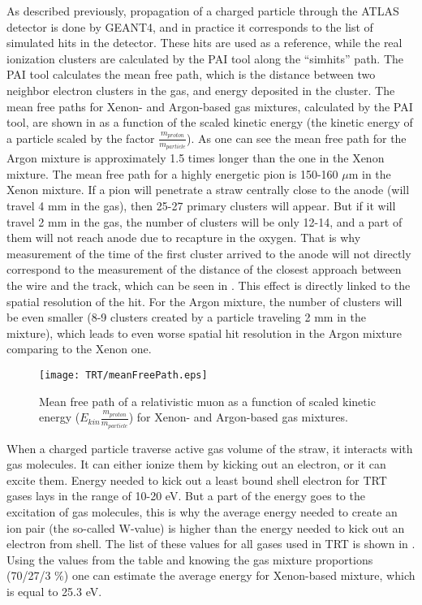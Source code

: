 As described previously, propagation of a charged particle through the ATLAS detector is done by GEANT4, and in practice it corresponds to the list of simulated hits in the detector.
These hits are used as a reference, while the real ionization clusters are calculated by the PAI tool along the ``simhits'' path.
The PAI tool calculates the mean free path, which is the distance between two neighbor electron clusters in the gas, and energy deposited in the cluster. 
The mean free paths for Xenon- and Argon-based gas mixtures, calculated by the PAI tool, are shown in  as a function of the scaled kinetic energy 
(the kinetic energy of a particle scaled by the factor $\frac{m_{proton}}{m_{particle}}$). As one can see the mean free path for the Argon mixture is approximately 1.5 times longer than the one in the Xenon mixture.
The mean free path for a highly energetic pion is 150-160 $\mu$m in the Xenon mixture. If a pion will penetrate a straw centrally close to the anode (will travel 4 mm in the gas), then 25-27 primary clusters will appear.
But if it will travel 2 mm in the gas, the number of clusters will be only 12-14, and a part of them will not reach anode due to recapture in the oxygen. 
That is why measurement of the time of the first cluster arrived to the anode will not directly correspond to the measurement of the distance of the closest approach between the wire and the track, 
which can be seen in . This effect is directly linked to the spatial resolution of the hit.
For the Argon mixture, the number of clusters will be even smaller (8-9 clusters created by a particle traveling 2 mm in the mixture), which leads to even worse spatial hit resolution in the Argon mixture comparing 
to the Xenon one.

\begin{figure}
\centering
 \texttt{[image: TRT/meanFreePath.eps]}
\caption{Mean free path of a relativistic muon as a function of scaled kinetic energy ($E_{kin}\frac{m_{proton}}{m_{particle}}$) for Xenon- and Argon-based gas mixtures.}
\label{fig:meanFreePath}
\end{figure}

When a charged particle traverse active gas volume of the straw, it interacts with gas molecules.
It can either ionize them by kicking out an electron, or it can excite them. Energy needed to kick out a least bound shell electron for TRT gases lays
in the range of 10-20 eV. But a part of the energy goes to the excitation of gas molecules, this is why the average energy needed to create an ion pair (the so-called W-value) is higher than the energy needed to 
kick out an electron from shell. The list of these values for all gases used in TRT is shown in .
Using the values from the table and knowing the gas mixture proportions (70/27/3 $\%$) one can estimate the average energy for Xenon-based mixture, which is equal to 25.3 eV.

